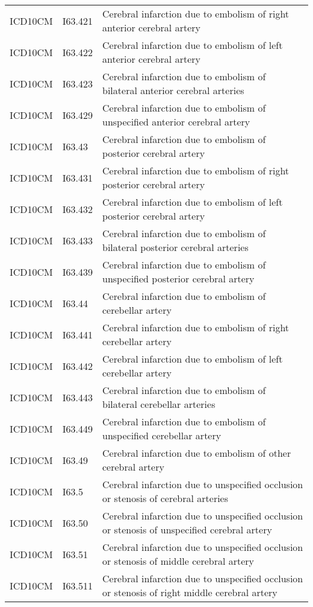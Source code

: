 \begin{longtable}{p{}p{}p{}}
  ICD10CM & I63.421 & Cerebral infarction due to embolism of right anterior cerebral artery \\ 
  ICD10CM & I63.422 & Cerebral infarction due to embolism of left anterior cerebral artery \\ 
  ICD10CM & I63.423 & Cerebral infarction due to embolism of bilateral anterior cerebral arteries \\ 
  ICD10CM & I63.429 & Cerebral infarction due to embolism of unspecified anterior cerebral artery \\ 
  ICD10CM & I63.43 & Cerebral infarction due to embolism of posterior cerebral artery \\ 
  ICD10CM & I63.431 & Cerebral infarction due to embolism of right posterior cerebral artery \\ 
  ICD10CM & I63.432 & Cerebral infarction due to embolism of left posterior cerebral artery \\ 
  ICD10CM & I63.433 & Cerebral infarction due to embolism of bilateral posterior cerebral arteries \\ 
  ICD10CM & I63.439 & Cerebral infarction due to embolism of unspecified posterior cerebral artery \\ 
  ICD10CM & I63.44 & Cerebral infarction due to embolism of cerebellar artery \\ 
  ICD10CM & I63.441 & Cerebral infarction due to embolism of right cerebellar artery \\ 
  ICD10CM & I63.442 & Cerebral infarction due to embolism of left cerebellar artery \\ 
  ICD10CM & I63.443 & Cerebral infarction due to embolism of bilateral cerebellar arteries \\ 
  ICD10CM & I63.449 & Cerebral infarction due to embolism of unspecified cerebellar artery \\ 
  ICD10CM & I63.49 & Cerebral infarction due to embolism of other cerebral artery \\ 
  ICD10CM & I63.5 & Cerebral infarction due to unspecified occlusion or stenosis of cerebral arteries \\ 
  ICD10CM & I63.50 & Cerebral infarction due to unspecified occlusion or stenosis of unspecified cerebral artery \\ 
  ICD10CM & I63.51 & Cerebral infarction due to unspecified occlusion or stenosis of middle cerebral artery \\ 
  ICD10CM & I63.511 & Cerebral infarction due to unspecified occlusion or stenosis of right middle cerebral artery \\ 

\end{longtable}
